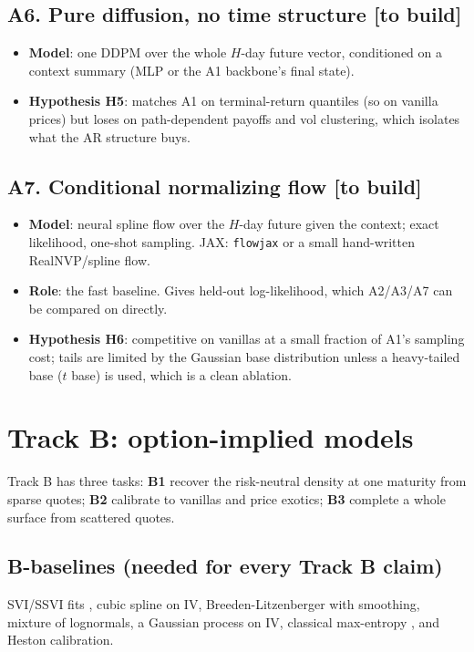 \documentclass[10pt]{article}
\newcommand{\status}[1]{\textsf{\small[#1]}}
\begin{document}
\subsection{A6. Pure diffusion, no time structure \status{to build}}
\begin{itemize}
\item \textbf{Model}: one DDPM over the whole $H$-day future vector, conditioned on a context summary (MLP or the A1
backbone's final state).
\item \textbf{Hypothesis H5}: matches A1 on terminal-return quantiles (so on vanilla prices) but loses on
path-dependent payoffs and vol clustering, which isolates what the AR structure buys.
\end{itemize}

\subsection{A7. Conditional normalizing flow \status{to build}}
\begin{itemize}
\item \textbf{Model}: neural spline flow \cite{nsf} over the $H$-day future given the context; exact likelihood,
one-shot sampling. JAX: \texttt{flowjax} or a small hand-written RealNVP/spline flow.
\item \textbf{Role}: the fast baseline. Gives held-out log-likelihood, which A2/A3/A7 can be compared on directly.
\item \textbf{Hypothesis H6}: competitive on vanillas at a small fraction of A1's sampling cost; tails are limited
by the Gaussian base distribution unless a heavy-tailed base ($t$ base) is used, which is a clean ablation.
\end{itemize}

\section{Track B: option-implied models}

Track B has three tasks: \textbf{B1} recover the risk-neutral density at one maturity from sparse quotes;
\textbf{B2} calibrate to vanillas and price exotics; \textbf{B3} complete a whole surface from scattered quotes.

\subsection{B-baselines (needed for every Track B claim)}
SVI/SSVI fits \cite{ssvi}, cubic spline on IV, Breeden-Litzenberger with smoothing, mixture of lognormals, a
Gaussian process on IV, classical max-entropy \cite{buchenkelly}, and Heston calibration.
\end{document}
